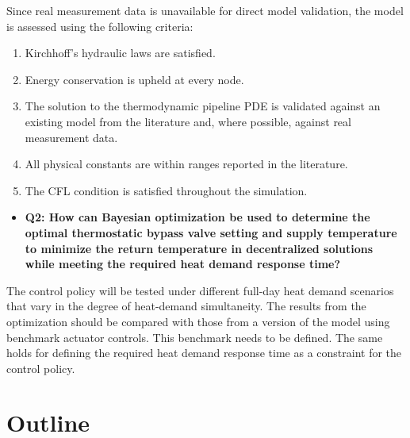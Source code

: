 Since real measurement data is unavailable for direct model validation, the model is assessed using the following criteria:
                               
\begin{enumerate}
    \item Kirchhoff's hydraulic laws are satisfied.
    \item Energy conservation is upheld at every node.
    \item The solution to the thermodynamic pipeline PDE is validated against an existing model from the literature and, where possible, against real measurement data.
    \item All physical constants are within ranges reported in the literature.
    \item The CFL condition is satisfied throughout the simulation.
\end{enumerate}


\begin{itemize}
  \renewcommand\labelitemi{} %
    \item \textbf{Q2: How can Bayesian optimization be used to determine the optimal thermostatic bypass valve setting and supply temperature to minimize the return temperature in decentralized solutions while meeting the required heat demand response time?}
\end{itemize}

The control policy will be tested under different full-day heat demand scenarios that vary in the degree of heat-demand simultaneity. The results from the optimization should be compared with those from a version of the model using benchmark actuator controls. This benchmark needs to be defined. The same holds for defining the required heat demand response time as a constraint for the control policy.


 
 
\section{Outline}




